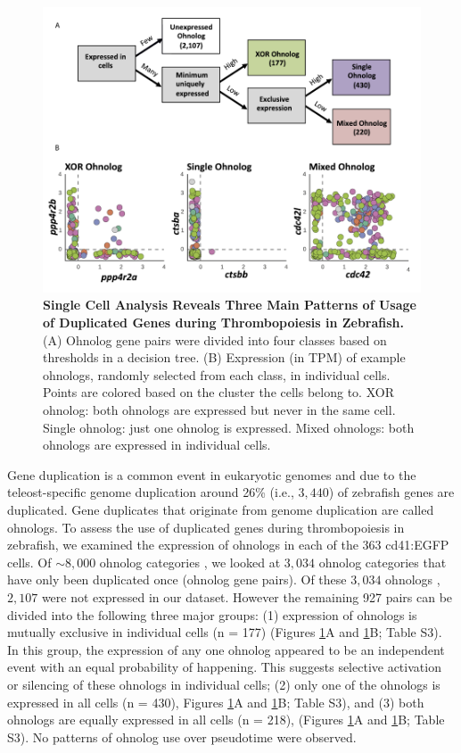 \begin{figure}
    \centering
    \includegraphics[width=\textwidth]{"Figure7"}
    \caption[Single Cell Analysis Reveals Three Main Patterns of Usage of Duplicated Genes during Thrombopoiesis in Zebrafish]{\textbf{Single Cell Analysis Reveals Three Main Patterns of Usage of Duplicated Genes during Thrombopoiesis in Zebrafish.} (A) Ohnolog gene pairs were divided into four classes based on thresholds in a decision tree. (B) Expression (in TPM) of example ohnologs, randomly selected from each class, in individual cells. Points are colored based on the cluster the cells belong to. XOR ohnolog: both ohnologs are expressed but never in the same cell. Single ohnolog: just one ohnolog is expressed. Mixed ohnologs: both ohnologs are expressed in individual cells.}
    \label{fig:ohnologs}
\end{figure}

Gene duplication is a common event in eukaryotic genomes \cite{Meyer1999-lb} and due to the teleost-specific genome duplication around 26\% (i.e., \( 3,440 \)) \cite{Howe2013-ul} of zebrafish genes are duplicated. Gene duplicates that originate from genome duplication are called ohnologs. To assess the use of duplicated genes during thrombopoiesis in zebrafish, we examined the expression of ohnologs in each of the 363 cd41:EGFP cells. Of \( \sim 8,000 \) ohnolog categories \cite{Howe2013-ul}, we looked at \( 3,034 \) ohnolog categories that have only been duplicated once (ohnolog gene pairs). Of these \( 3,034 \) ohnologs \cite{Howe2013-ul}, \( 2,107 \) were not expressed in our dataset. However the remaining 927 pairs can be divided into the following three major groups: (1) expression of ohnologs is mutually exclusive in individual cells (n = 177) (Figures \ref{fig:ohnologs}A and \ref{fig:ohnologs}B; Table S3). In this group, the expression of any one ohnolog appeared to be an independent event with an equal probability of happening. This suggests selective activation or silencing of these ohnologs in individual cells; (2) only one of the ohnologs is expressed in all cells (n = 430), Figures \ref{fig:ohnologs}A and \ref{fig:ohnologs}B; Table S3), and (3) both ohnologs are equally expressed in all cells (n = 218), (Figures \ref{fig:ohnologs}A and \ref{fig:ohnologs}B; Table S3). No patterns of ohnolog use over pseudotime were observed.

